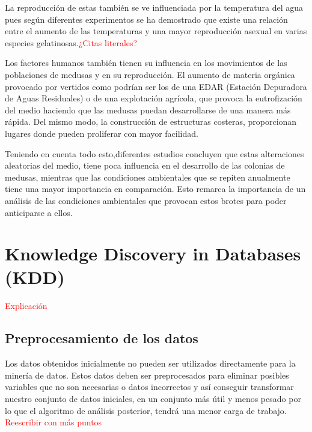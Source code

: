 La reproducción de estas también se ve influenciada por la temperatura del agua pues según diferentes experimentos se ha demostrado que existe una relación entre el aumento de las temperaturas y una mayor reproducción asexual en varias especies gelatinosas.\textcolor{red}{¿Citas literales?}

Los factores humanos también tienen su influencia en los movimientos de las poblaciones de medusas y en su reproducción. 
El aumento de materia orgánica provocado por vertidos como podrían ser los de una EDAR (Estación Depuradora de Aguas Residuales) o de una explotación agrícola, que provoca la eutrofización del medio haciendo que las medusas puedan desarrollarse de una manera más rápida. Del mismo modo, la construcción de estructuras costeras, proporcionan lugares donde pueden proliferar con mayor facilidad.


Teniendo en cuenta todo esto,diferentes estudios concluyen que estas alteraciones aleatorias del medio, tiene poca influencia en el desarrollo de las colonias de medusas, mientras que las condiciones ambientales que se repiten anualmente tiene una mayor importancia en comparación. Esto remarca la importancia de un análisis de las condiciones ambientales que provocan estos brotes para poder anticiparse a ellos.\cite{art:ArticuloCanepa_1}

\section{Knowledge Discovery in Databases (KDD)}
\textcolor{red}{Explicación}
\subsection{Preprocesamiento de los datos}
Los datos obtenidos inicialmente no pueden ser utilizados directamente para la minería de datos. Estos datos deben ser preprocesados para eliminar posibles variables que no son necesarias o datos incorrectos y así conseguir transformar nuestro conjunto de datos iniciales, en un conjunto más útil y menos pesado por lo que el algoritmo de análisis posterior, tendrá una menor carga de trabajo. 
\textcolor{red}{Reescribir con más puntos}
